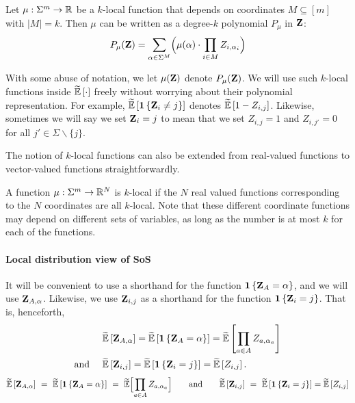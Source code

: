 Let $\mu:\Sigma^m\rightarrow \R$ be a $k$-local function that depends on coordinates $M\subseteq [m]$ with $|M|=k$. Then $\mu$ can be written as a degree-$k$ polynomial $P_{\mu}$ in $\zee$:
\[
	P_{\mu}(\zee) = \sum_{\alpha \in \Sigma^M} \parens[\Big]{\mu(\alpha) \cdot\prod_{i\in M} Z_{i,\alpha_i}}
\]


With some abuse of notation, we let $\mu(\zee)$ denote $P_{\mu}(\zee)$. We will use such $k$-local
functions inside $\tildeEx{\cdot}$ freely without worrying about their polynomial
representation. For example, $\tildeEx{ \indi{\zee_{i} \neq j}}$ denotes $\tildeEx{ 1- Z_{i,j}}$. Likewise, sometimes we will say we set $\zee_i = j$ to mean that we set $Z_{i,j} = 1$ and $Z_{i,j'} = 0$ for all $j'\in \Sigma \backslash \{j\}$.

The notion of $k$-local functions can also be extended from real-valued functions to vector-valued functions straightforwardly.

\begin{definition}
A function $\mu: \Sigma^m \rightarrow \R^N$ is $k$-local if the $N$ real valued functions corresponding to the $N$ coordinates are all $k$-local. Note that these different coordinate functions may depend on different sets of variables, as long as the number is at most $k$ for each of the functions.
\end{definition}
%
%
\paragraph{Local distribution view of SoS}

It will be convenient to use a shorthand for the function $\indi{\zee_A = \alpha}$, and we will use $\zee_{A,\alpha}$. Likewise, we use $\zee_{i,j}$ as a shorthand for the function $\indi{\zee_i = j}$. That is, henceforth,
\ifnum{}
\begin{align*}
	&\tildeEx{\zee_{A,\alpha}} = \tildeEx{\indi{\zee_A = \alpha}} = \tildeEx{ \prod_{a\in A}
                             Z_{a,\alpha_a}}
                             \\
	\text{and } \quad & \tildeEx{\zee_{i,j}} = \tildeEx{\indi{\zee_i = j}} = \tildeEx{ Z_{i,j}}.
\end{align*}
\else
\begin{align*}
	\tildeEx{\zee_{A,\alpha}} ~=~ \tildeEx{\indi{\zee_A = \alpha}} ~=~ \tildeE\brackets[\Big]{\prod_{a\in A}
                      Z_{a,\alpha_a}
                                    }
\qquad \text{and} \qquad
	\tildeEx{\zee_{i,j}} ~=~ \tildeEx{\indi{\zee_i = j}} = \tildeEx{ Z_{i,j}}
\end{align*}
\fi

